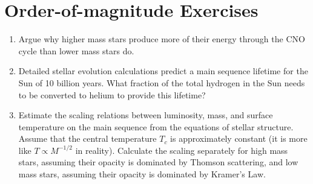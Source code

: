 \section{Order-of-magnitude Exercises}

\begin{enumerate} 
\item Argue why higher mass stars produce more of their energy through
    the CNO cycle than lower mass stars do.
\item Detailed stellar evolution calculations predict a main sequence
    lifetime for the Sun of 10 billion years. What fraction of the
    total hydrogen in the Sun needs to be converted to helium to
    provide this lifetime?
\item Estimate the scaling relations between luminosity, mass, and
    surface temperature on the main sequence from the equations of
    stellar structure. Assume that the central temperature $T_c$ is
    approximately constant (it is more like $T\propto M^{-1/2}$ in
    reality). Calculate the scaling separately for high mass stars,
    assuming their opacity is dominated by Thomson scattering, and low
    mass stars, assuming their opacity is dominated by Kramer's Law.


\end{enumerate}
